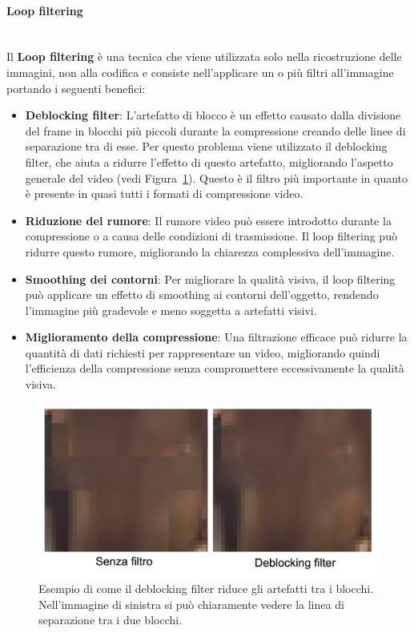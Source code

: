 \documentclass[a4paper,12pt, oneside]{article}
\begin{document}
\paragraph{Loop filtering}\hphantom{A}\\
Il \textbf{Loop filtering} è una tecnica che viene utilizzata solo nella ricostruzione delle immagini,
non alla codifica e consiste nell'applicare un o più filtri all'immagine portando i seguenti benefici:

\begin{itemize}
    \item \textbf{Deblocking filter}: L'artefatto di blocco è un effetto causato dalla divisione del frame
    in blocchi più piccoli durante la compressione creando delle linee di separazione tra di esse.
    Per questo problema viene utilizzato il deblocking filter, che aiuta a ridurre l'effetto di questo
    artefatto, migliorando l'aspetto generale del video (vedi Figura~\ref{fig:deblocking_filter}).
    Questo è il filtro più importante in quanto è presente in quasi tutti i formati di compressione video.
    \item \textbf{Riduzione del rumore}: Il rumore video può essere introdotto durante la compressione
    o a causa delle condizioni di trasmissione. Il loop filtering può ridurre questo rumore,
    migliorando la chiarezza complessiva dell'immagine.
    \item \textbf{Smoothing dei contorni}: Per migliorare la qualità visiva, il loop filtering può
    applicare un effetto di smoothing ai contorni dell'oggetto, rendendo l'immagine più gradevole e
    meno soggetta a artefatti visivi.
    \item \textbf{Miglioramento della compressione}: Una filtrazione efficace può ridurre la quantità
    di dati richiesti per rappresentare un video, migliorando quindi l'efficienza della compressione
    senza compromettere eccessivamente la qualità visiva.
\end{itemize}

\begin{figure}[h]
    \centering
    \includegraphics[width=1\textwidth]{images/deblocking-filter.png}
    \caption{Esempio di come il deblocking filter riduce gli artefatti tra i blocchi. Nell'immagine di
    sinistra si può chiaramente vedere la linea di separazione tra i due blocchi.}
    \label{fig:deblocking_filter}
\end{figure}
\end{document}
